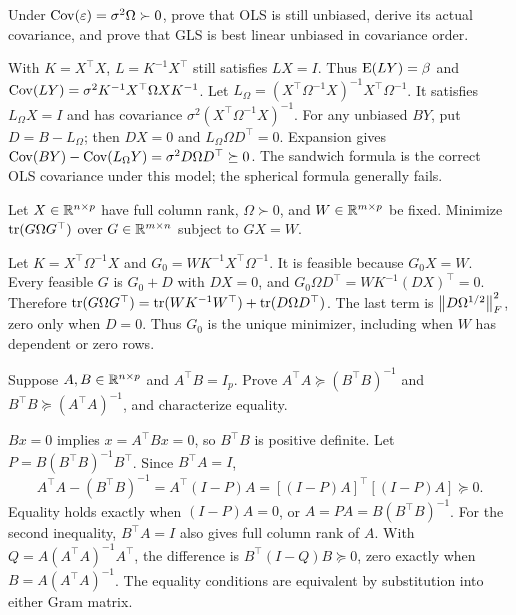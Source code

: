 \begin{problem}
Under $\operatorname{Cov}(\varepsilon)=\sigma^2\Omega\succ0$, prove that OLS is still
unbiased, derive its actual covariance, and prove that GLS is best linear
unbiased in covariance order.
\end{problem}
\begin{solution}
With $K=X^\top X$, $L=K^{-1}X^\top$ still satisfies $LX=I$.
Thus $\operatorname{E}(LY)=\beta$ and
$\operatorname{Cov}(LY)=\sigma^2K^{-1}X^\top\Omega XK^{-1}$.
Let $L_\Omega=(X^\top\Omega^{-1}X)^{-1}X^\top\Omega^{-1}$.
It satisfies $L_\Omega X=I$ and has covariance
$\sigma^2(X^\top\Omega^{-1}X)^{-1}$.
For any unbiased $BY$, put $D=B-L_\Omega$; then $DX=0$ and
$L_\Omega\Omega D^\top=0$. Expansion gives
$\operatorname{Cov}(BY)-\operatorname{Cov}(L_\Omega Y)=\sigma^2D\Omega D^\top\succeq0$.
The sandwich formula is the correct OLS covariance under this model;
the spherical formula generally fails.
\end{solution}

\begin{problem}
Let $X\in\mathbb R^{n\times p}$ have full column rank, $\Omega\succ0$, and
$W\in\mathbb R^{m\times p}$ be fixed. Minimize $\operatorname{tr}(G\Omega G^\top)$ over
$G\in\mathbb R^{m\times n}$ subject to $GX=W$.
\end{problem}
\begin{solution}
Let $K=X^\top\Omega^{-1}X$ and $G_0=WK^{-1}X^\top\Omega^{-1}$.
It is feasible because $G_0X=W$. Every feasible $G$ is $G_0+D$ with
$DX=0$, and $G_0\Omega D^\top=WK^{-1}(DX)^\top=0$.
Therefore
$\operatorname{tr}(G\Omega G^\top)=\operatorname{tr}(WK^{-1}W^\top)+\operatorname{tr}(D\Omega D^\top)$.
The last term is $\left\lVert D\Omega^{1/2}\right\rVert_F^2$, zero only when $D=0$.
Thus $G_0$ is the unique minimizer, including when $W$ has dependent or
zero rows.
\end{solution}

\begin{problem}
Suppose $A,B\in\mathbb R^{n\times p}$ and $A^\top B=I_p$. Prove
$A^\top A\succeq(B^\top B)^{-1}$ and
$B^\top B\succeq(A^\top A)^{-1}$, and characterize equality.
\end{problem}
\begin{solution}
$Bx=0$ implies $x=A^\top Bx=0$, so $B^\top B$ is positive definite.
Let $P=B(B^\top B)^{-1}B^\top$. Since $B^\top A=I$,
\[
A^\top A-(B^\top B)^{-1}=A^\top(I-P)A
=[(I-P)A]^\top[(I-P)A]\succeq0.
\]
Equality holds exactly when $(I-P)A=0$, or
$A=PA=B(B^\top B)^{-1}$.
For the second inequality, $B^\top A=I$ also gives full column rank of
$A$. With $Q=A(A^\top A)^{-1}A^\top$, the difference is
$B^\top(I-Q)B\succeq0$, zero exactly when $B=A(A^\top A)^{-1}$.
The equality conditions are equivalent by substitution into either
Gram matrix.
\end{solution}


